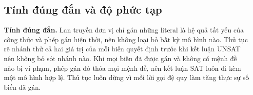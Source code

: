 


\subsection{Tính đúng đắn và độ phức tạp}
\label{subsec:dpll-dung-dan}

\textbf{Tính đúng đắn.} Lan truyền đơn vị chỉ gán những literal là hệ quả tất yếu của công thức và phép gán hiện thời, nên không loại bỏ bất kỳ mô hình nào. Thủ tục rẽ nhánh thử cả hai giá trị của mỗi biến quyết định trước khi kết luận UNSAT nên không bỏ sót nhánh nào. Khi mọi biến đã được gán và không có mệnh đề nào bị vi phạm, phép gán đó thỏa mọi mệnh đề, nên kết luận SAT luôn đi kèm một mô hình hợp lệ. Thủ tục luôn dừng vì mỗi lời gọi đệ quy làm tăng thực sự số biến đã gán.

